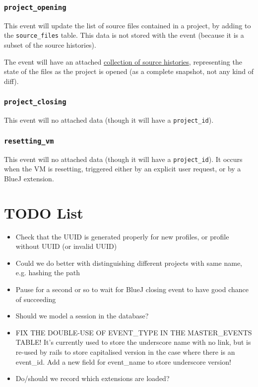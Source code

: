 \documentclass{book}
\begin{document}
\subsection{\texttt{project\_opening}}

This event will update the list of source files contained in a project, by
adding to the \texttt{source\_files} table.  This data is not stored with the
event (because it is a subset of the source histories).

The event will have an attached \hyperref[tab:source_histories]{collection of
  source histories}, representing the state of the files as the project is
opened (as a complete snapshot, not any kind of diff).

\subsection{\texttt{project\_closing}}

This event will no attached data (though it will have a \texttt{project\_id}).

\subsection{\texttt{resetting\_vm}}

This event will no attached data (though it will have a
\texttt{project\_id}).  It occurs when the VM is resetting, triggered either
by an explicit user request, or by a BlueJ extension.

\chapter{TODO List}

\begin{itemize}
\item Check that the UUID is generated properly for new profiles, or profile without
UUID (or invalid UUID)
\item Could we do better with distinguishing different projects with same
  name, e.g. hashing the path
\item Pause for a second or so to wait for BlueJ closing event to have good
  chance of succeeding
\item Should we model a session in the database?
\item FIX THE DOUBLE-USE OF EVENT\_TYPE IN THE MASTER\_EVENTS TABLE!  It's
  currently used to store the underscore name with no link, but is re-used by
  rails to store capitalised version in the case where there is an event\_id.
  Add a new field for event\_name to store underscore version!
\item Do/should we record which extensions are loaded?
\end{itemize}
\end{document}
